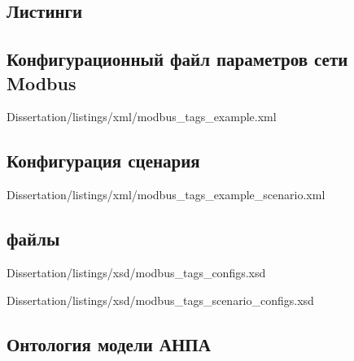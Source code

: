 \begin{landscape}
\chapter{Листинги}
\section{Конфигурационный файл параметров сети Modbus}\label{app:sec:modbus_tag}
    
            {Dissertation/listings/xml/modbus_tags_example.xml}
\end{landscape}

\section{Конфигурация сценария}\label{app:sec:modbus_scenario_example_diagram}

        {Dissertation/listings/xml/modbus_tags_example_scenario.xml}

\begin{landscape}
\section{ файлы}\label{app:sec:xsd}
    
            {Dissertation/listings/xsd/modbus_tags_configs.xsd}
    
    
            {Dissertation/listings/xsd/modbus_tags_scenario_configs.xsd}        
\end{landscape}

\begin{landscape}
    \section{Онтология модели АНПА}\label{app:sec:anpa_owl}
\end{landscape}


